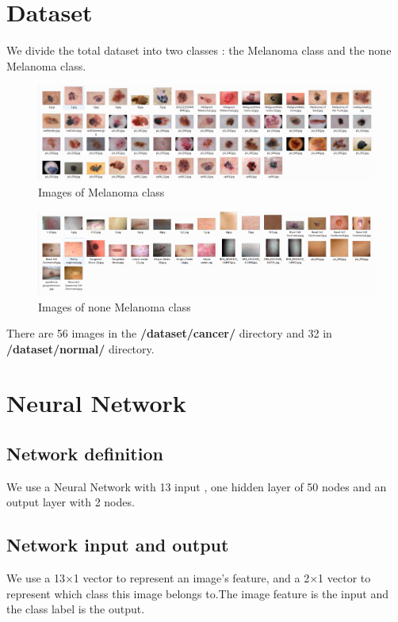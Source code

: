 \documentclass[14pt]{report} %
\begin{document}
\section{Dataset}
	We divide the total dataset into two classes : the Melanoma class and the none Melanoma class. 
	\begin{figure}[H]
		\includegraphics[width=\textwidth]{image/cancers.jpg} 
		\caption{Images of Melanoma class} 
		 \label{fig:ImagesofMelanomaclass} 
	\end{figure}
	\begin{figure}[H]
		\includegraphics[width=\textwidth]{image/nonecancer.jpg} 
		\caption{Images of none Melanoma class} 
		 \label{fig:ImagesofNoneMelanomaclass} 
	\end{figure}
	There are 56 images in the \textbf{/dataset/cancer/} directory  and 32 in \textbf{/dataset/normal/} directory.
\section{Neural Network}
\subsection{Network definition}
	We use a Neural Network with 13 input , one hidden layer of 50 nodes and an output layer with 2 nodes. 
\subsection{Network input and output}
	We use a 13×1 vector to represent an image's feature, and a 2×1 vector to represent which class this image belongs to.The image feature is the input and the class label is the output.
\end{document}
